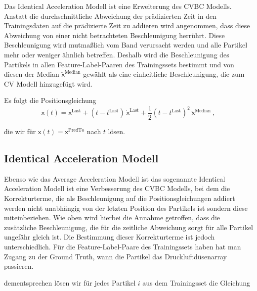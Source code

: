 Das Identical Acceleration Modell ist eine Erweiterung des CVBC Modells.
Anstatt die durchschnittliche Abweichung der prädizierten Zeit in den Trainingsdaten auf die prädizierte Zeit zu addieren wird angenommen, 
dass diese Abweichung von einer nicht betrachteten Beschleunigung herrührt.
Diese Beschleunigung wird mutmaßlich vom Band verursacht werden und alle Partikel mehr oder weniger ähnlich betreffen.
Deshalb wird die Beschleunigung des Partikels in allen Feature-Label-Paaren des Trainingssets bestimmt
und von diesen der Median \(\ddot{ \mathsf{x}}^{\text{Median}}\) gewählt als eine einheitliche Beschleunigung, die zum CV Modell hinzugefügt wird.

Es folgt die Positionsgleichung
\begin{equation*}
    \mathsf{x}(t) =  \mathsf{x}^{\text{Last}} + (t - t^{\text{Last}}) \: \dot{ \mathsf{x}}^{\text{Last}} 
    + \frac{1}{2} (t - t^{\text{Last}})^2 \: \ddot{ \mathsf{x}}^{\text{Median}} \: ,
\end{equation*}

die wir für \(\mathsf{x}(t) =  \mathsf{x}^{\text{PredTo}}\) nach \(t\) lösen.


\subsection{Identical Acceleration Modell}


Ebenso wie das Average Acceleration Modell ist das  sogenannte Identical Acceleration Modell ist eine Verbesserung des CVBC Modells, 
bei dem die Korrekturterme, die als Beschleunigung auf die Positionsgleichungen addiert werden nicht unabhängig von der letzten Position des Partikels ist sondern diese miteinbeziehen.
Wie oben wird hierbei die Annahme getroffen, dass die zusätzliche Beschleunigung, die für die zeitliche Abweichung sorgt für alle Partikel ungefähr gleich ist.
Die Bestimmung dieser Korrekturterme ist jedoch unterschiedlich.
Für die Feature-Label-Paare des Trainingssets haben hat man Zugang zu der Ground Truth, wann die Partikel das Druckluftdüsenarray passieren.

dementsprechen lösen wir für jedes Partikel \( i\) aus dem Trainingsset die Gleichung

